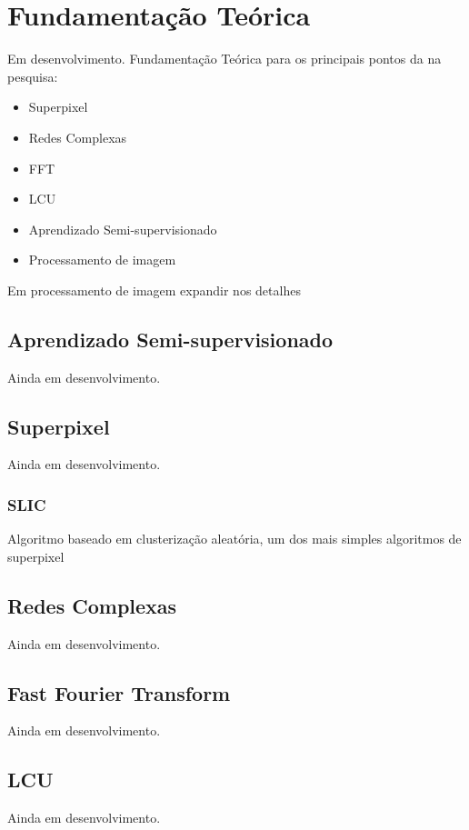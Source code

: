 \chapter{Fundamentação Teórica}\label{cap:fundamentacao-teorica}

Em desenvolvimento. Fundamentação Teórica para os principais pontos da
na pesquisa:

\begin{itemize}
\item Superpixel
\item Redes Complexas
\item \gls{FFT}
\item \gls{LCU}
\item Aprendizado Semi-supervisionado
\item Processamento de imagem
\end{itemize}

Em processamento de imagem expandir nos detalhes


\section{Aprendizado Semi-supervisionado}\label{sec:teorica-aprendizado-semi-supervisionado}

Ainda em desenvolvimento.

\section{Superpixel}\label{sec:teorica-superpixel}

Ainda em desenvolvimento.

\subsection{SLIC}\label{sec:teorica-superpixel-slic}

Algoritmo baseado em clusterização aleatória, um dos mais simples
algoritmos de superpixel

\section{Redes Complexas}\label{sec:teorica-redes-complexas}

Ainda em desenvolvimento.

\section{Fast Fourier Transform}\label{sec:teorica-fast-fourier-transform}

Ainda em desenvolvimento.

\section{LCU}\label{sec:teorica-lcu}

Ainda em desenvolvimento.
